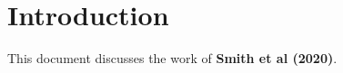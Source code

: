 \documentclass{article}
\begin{document}

\section{Introduction} %

This document discusses the work of \textbf{Smith et al (2020)}. %
	
\end{document}
